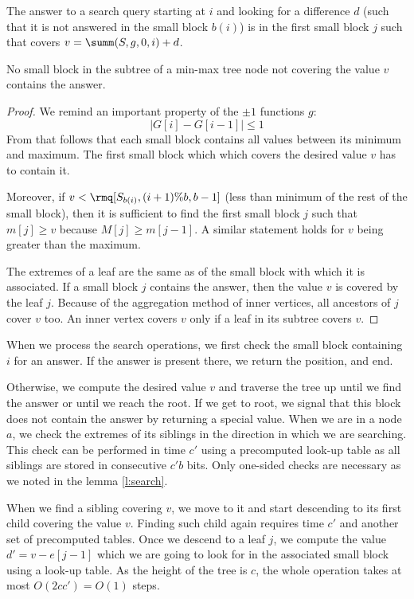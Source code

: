 \begin{lemma}\label{l:search}
	The answer to a search query starting at $i$ and looking for a difference $d$ (such that it is not answered in the small block $b(i)$) is in the first small block $j$ such that covers $v = \summ(S, g, 0, i) + d$.
	
	No small block in the subtree of a min-max tree node not covering the value $v$ contains the answer.
\end{lemma}
\begin{proof}
	We remind an important property of the $\pm 1$ functions $g$: 
	$$| G[i] - G[i-1] | \le 1$$
	From that follows that each small block contains all values between its minimum and maximum.
	The first small block which which covers the desired value $v$ has to contain it.
	
	Moreover, if $v < \rmq[S_{b(i)}, (i + 1) \% b, b - 1]$ (less than minimum of the rest of the small block), then it is sufficient to find the first small block $j$ such that $m[j] \ge v$ because $M[j] \ge m[j-1]$.
	A similar statement holds for $v$ being greater than the maximum.
	
	The extremes of a leaf are the same as of the small block with which it is associated.
	If a small block $j$ contains the answer, then the value $v$ is covered by the leaf $j$.
	Because of the aggregation method of inner vertices, all ancestors of $j$ cover $v$ too.
	An inner vertex covers $v$ only if a leaf in its subtree covers $v$.
\end{proof}

When we process the search operations, we first check the small block containing $i$ for an answer.
If the answer is present there, we return the position, and end.

Otherwise, we compute the desired value $v$ and traverse the tree up until we find the answer or until we reach the root.
If we get to root, we signal that this block does not contain the answer by returning a special value.
When we are in a node $a$, we check the extremes of its siblings in the direction in which we are searching.
This check can be performed in time $c'$ using a precomputed look-up table as all siblings are stored in consecutive $c' b$ bits.
Only one-sided checks are necessary as we noted in the lemma \ref{l:search}.

When we find a sibling covering $v$, we move to it and start descending to its first child covering the value $v$.
Finding such child again requires time $c'$ and another set of precomputed tables.
Once we descend to a leaf $j$, we compute the value $d' = v - e[j - 1]$ which we are going to look for in the associated small block using a look-up table. 
As the height of the tree is $c$, the whole operation takes at most $O(2 c c') = O(1)$ steps.

